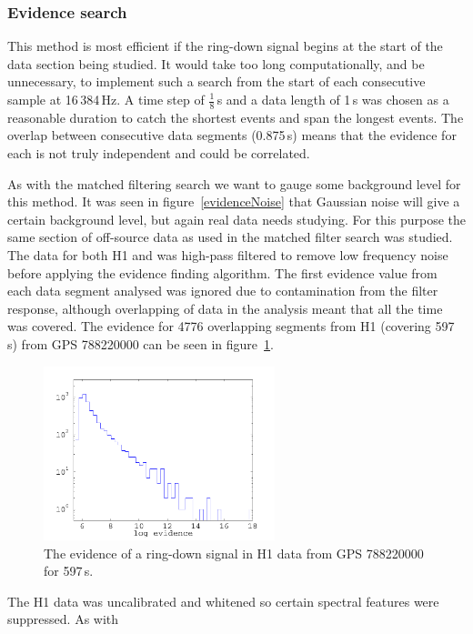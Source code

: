 \subsubsection{Evidence search}
This method is most efficient if the ring-down signal begins at the start of the data section being
studied. It would take too long computationally, and be unnecessary, to implement such a search from
the start of each consecutive sample at 16\,384\,Hz. A time step of $\frac{1}{8}$\,s and a data
length of 1\,s was chosen as a reasonable duration to catch the shortest events and span the longest
events. The overlap between consecutive data segments (0.875\,s) means that the evidence for each is
not truly independent and could be correlated. 

As with the matched filtering search we want to gauge some background level for this method. It was
seen in figure~\ref{evidenceNoise} that Gaussian noise will give a certain background level, but
again real data needs studying. For this purpose the same section of off-source data as used in the
matched filter search was studied. The data for both H1 and \geo was high-pass filtered to remove
low frequency noise before applying the evidence finding algorithm. The first evidence value from
each data segment analysed was ignored due to contamination from the filter response, although
overlapping of data in the analysis meant that all the time was covered. The evidence for 4776
overlapping segments from H1 (covering 597\,s) from GPS 788220000 can be seen in
figure~\ref{H1EvidenceOffsource}.
\begin{figure}[!htbp]
\begin{center}
\includegraphics[width=0.6\textwidth]{figs/H1EvidenceOffsource}\caption{The evidence
of a ring-down signal in H1 data from GPS 788220000 for 597\,s.}\label{H1EvidenceOffsource}
\end{center}
\end{figure}
The H1 data was uncalibrated and whitened so certain spectral features were suppressed. As with
